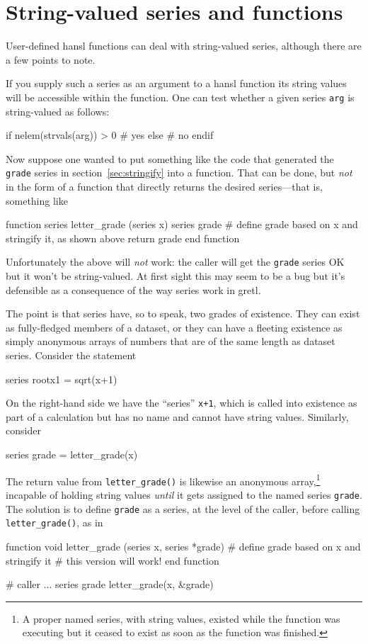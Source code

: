 \section{String-valued series and functions}

User-defined hansl functions can deal with string-valued series,
although there are a few points to note.

If you supply such a series as an argument to a hansl function its
string values will be accessible within the function. One can test
whether a given series \texttt{arg} is string-valued as follows:
\begin{code}
if nelem(strvals(arg)) > 0
  # yes
else
  # no
endif
\end{code}

Now suppose one wanted to put something like the code that generated
the \texttt{grade} series in section~\ref{sec:stringify} into a
function. That can be done, but \textit{not} in the form of a function
that directly returns the desired series---that is, something like
\begin{code}
function series letter_grade (series x)
  series grade
  # define grade based on x and stringify it, as shown above
  return grade
end function
\end{code}
%
Unfortunately the above will \emph{not} work: the caller will get the
\texttt{grade} series OK but it won't be string-valued. At first sight
this may seem to be a bug but it's defensible as a consequence of the
way series work in gretl.

The point is that series have, so to speak, two grades of
existence. They can exist as fully-fledged members of a dataset, or
they can have a fleeting existence as simply anonymous arrays of
numbers that are of the same length as dataset series. Consider the
statement
\begin{code}
series rootx1 = sqrt(x+1)
\end{code}
On the right-hand side we have the ``series'' \texttt{x+1}, which is
called into existence as part of a calculation but has no name and
cannot have string values. Similarly, consider
\begin{code}
series grade = letter_grade(x)
\end{code}
The return value from \verb|letter_grade()| is likewise an anonymous
array,\footnote{A proper named series, with string values, existed
  while the function was executing but it ceased to exist as soon as
  the function was finished.} incapable of holding string values
\textit{until} it gets assigned to the named series
\texttt{grade}. The solution is to define \texttt{grade} as a series,
at the level of the caller, before calling \verb|letter_grade()|, as
in
%
\begin{code}
function void letter_grade (series x, series *grade)
  # define grade based on x and stringify it
  # this version will work!
end function

# caller
...
series grade
letter_grade(x, &grade)
\end{code}

